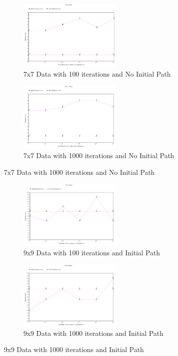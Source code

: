 \documentclass[11pt, oneside]{article}   	%
\begin{document}
\begin{figure}[H]
\centering
\begin{subfigure}{.5\textwidth}
	\centering
	\includegraphics[width=50mm]{7x7downPath.png}
	\caption{7x7 Data with 100 iterations and No Initial Path}
	\label{fig:method}
\end{subfigure}%
\begin{subfigure}{.5\textwidth}
	\centering
	\includegraphics[width=50mm]{7x7downPath2.png}
	\caption{7x7 Data with 1000 iterations and No Initial Path}
	\label{fig:method}
\end{subfigure}
\end{figure}

\begin{figure}[H]
\centering
\begin{subfigure}{.5\textwidth}
	\centering
	\includegraphics[width=50mm]{9x9down.png}
	\caption{9x9 Data with 100 iterations and Initial Path}
	\label{fig:method}
\end{subfigure}%
\begin{subfigure}{.5\textwidth}
	\centering
	\includegraphics[width=50mm]{9x9down2.png}
	\caption{9x9 Data with 1000 iterations and Initial Path}
	\label{fig:method}
\end{subfigure}
\end{figure}
\end{document}
